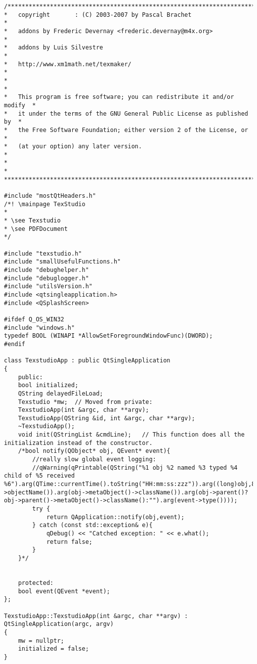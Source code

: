 \begin{lstlisting}[style=cstyle]
/***************************************************************************
*   copyright       : (C) 2003-2007 by Pascal Brachet                     *
*   addons by Frederic Devernay <frederic.devernay@m4x.org>               *
*   addons by Luis Silvestre                                              *
*   http://www.xm1math.net/texmaker/                                      *
*                                                                         *
*   This program is free software; you can redistribute it and/or modify  *
*   it under the terms of the GNU General Public License as published by  *
*   the Free Software Foundation; either version 2 of the License, or     *
*   (at your option) any later version.                                   *
*                                                                         *
***************************************************************************/

#include "mostQtHeaders.h"
/*! \mainpage TexStudio
*
* \see Texstudio
* \see PDFDocument
*/

#include "texstudio.h"
#include "smallUsefulFunctions.h"
#include "debughelper.h"
#include "debuglogger.h"
#include "utilsVersion.h"
#include <qtsingleapplication.h>
#include <QSplashScreen>

#ifdef Q_OS_WIN32
#include "windows.h"
typedef BOOL (WINAPI *AllowSetForegroundWindowFunc)(DWORD);
#endif

class TexstudioApp : public QtSingleApplication
{
	public:
	bool initialized;
	QString delayedFileLoad;
	Texstudio *mw;  // Moved from private:
	TexstudioApp(int &argc, char **argv);
	TexstudioApp(QString &id, int &argc, char **argv);
	~TexstudioApp();
	void init(QStringList &cmdLine);   // This function does all the initialization instead of the constructor.
	/*bool notify(QObject* obj, QEvent* event){
		//really slow global event logging:
		//qWarning(qPrintable(QString("%1 obj %2 named %3 typed %4 child of %5 received %6").arg(QTime::currentTime().toString("HH:mm:ss:zzz")).arg((long)obj,8,16).arg(obj->objectName()).arg(obj->metaObject()->className()).arg(obj->parent()?obj->parent()->metaObject()->className():"").arg(event->type())));
		try {
			return QApplication::notify(obj,event);
		} catch (const std::exception& e){
			qDebug() << "Catched exception: " << e.what();
			return false;
		}
	}*/


	protected:
	bool event(QEvent *event);
};

TexstudioApp::TexstudioApp(int &argc, char **argv) : QtSingleApplication(argc, argv)
{
	mw = nullptr;
	initialized = false;
}


\end{lstlisting}

